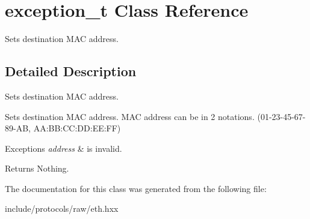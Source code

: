 \hypertarget{classexception__t}{\section{exception\+\_\+t Class Reference}
\label{classexception__t}
}


Sets destination M\+A\+C address.  




\subsection{Detailed Description}
Sets destination M\+A\+C address. 

Sets destination M\+A\+C address. M\+A\+C address can be in 2 notations. (01-\/23-\/45-\/67-\/89-\/\+A\+B, A\+A\+:\+B\+B\+:\+C\+C\+:\+D\+D\+:\+E\+E\+:F\+F) 
\begin{DoxyExceptions}{Exceptions}
{\em address} & is invalid. \\
\hline
\end{DoxyExceptions}
\begin{DoxyReturn}{Returns}
Nothing. 
\end{DoxyReturn}


The documentation for this class was generated from the following file\+:\begin{DoxyCompactItemize}
\item 
include/protocols/raw/eth.\+hxx\end{DoxyCompactItemize}
